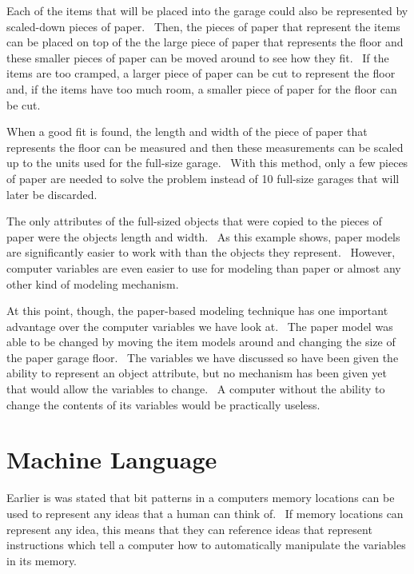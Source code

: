 \documentclass[12pt,twoside]{book}
\begin{document}
\bigskip

Each of the items that will be placed into the garage could also be represented by scaled{}-down pieces of paper. \ Then, the pieces of paper that represent the items can be placed on top of the the large piece of paper that represents the floor and these smaller pieces of paper can be moved around to see how they fit. \ If the items are too cramped, a larger piece of paper can be cut to represent the floor and, if the items have too much room, a smaller piece of paper for the floor can be cut. 

\bigskip

When a good fit is found, the length and width of the piece of paper that represents the floor can be measured and then these measurements can be scaled up to the units used for the full{}-size garage. \ With this method, only a few pieces of paper are needed to solve the problem instead of 10 full{}-size garages that will later be discarded. 

\bigskip

The only attributes of the full{}-sized objects that were copied to the pieces of paper were the object{\textquotesingle}s length and width. \ As this example shows, paper models are significantly easier to work with than the objects they represent. \ However, computer variables are even easier to use for modeling than paper or almost any other kind of modeling mechanism.


\bigskip

At this point, though, the paper{}-based modeling technique has one important advantage over the computer variables we have look at. \ The paper model was able to be changed by moving the item models around and changing the size of the paper garage floor. \ The variables we have discussed so have been given the ability to represent an object attribute, but no mechanism has been given yet that would allow the variable{\textquotesingle}s to change. \ A computer without the ability to change the contents of its variables would be practically useless.

\section[Machine Language]{Machine Language}

Earlier is was stated that bit patterns in a computer{\textquotesingle}s memory locations can be used to represent any ideas that a human can think of. \ If memory locations can represent any idea, this means that they can reference ideas that represent instructions which tell a computer how to automatically manipulate the variables in its memory. 
\end{document}
